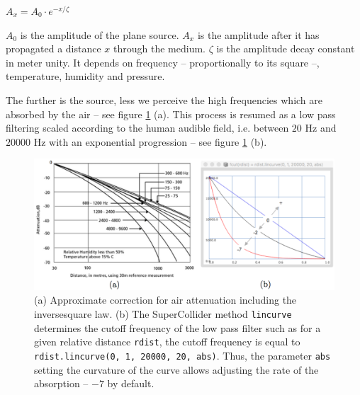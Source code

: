 \documentclass{book}
\begin{document}
$A_x=A_0\cdot e^{- x/\zeta}$ 

\bigskip

$A_0$ is the amplitude of the plane source. $A_x$ is the amplitude after it has propagated a distance $x$ through the medium.
$\zeta$ is the amplitude decay constant in meter unity. It depends on frequency -- proportionally to its square --, temperature, humidity and pressure.

\bigskip

The further is the source, less we perceive the high frequencies which are absorbed by the air -- see figure \ref{fig:fcut} (a). This process is resumed as a low pass filtering scaled according to the human audible field, i.e. between $20$ Hz and $20000$ Hz with an exponential progression -- see figure \ref{fig:fcut} (b).

\begin{figure}[H]
\begin{center}
\includegraphics[width=\textwidth]{img/6785}
\caption{(a) \citep{bk} Approximate correction for air attenuation including the inversesquare law. (b) The SuperCollider method \texttt{lincurve} determines the cutoff frequency of the low pass filter such as for a given relative distance \texttt{rdist}, the cutoff frequency is equal to \texttt{rdist.lincurve(0, 1, 20000, 20, abs)}. Thus, the parameter \texttt{abs} setting the curvature of the curve allows adjusting the rate of the absorption -- $-7$ by default. 
}
\label{fig:fcut}
\end{center}
\end{figure}


\newpage
\end{document}
